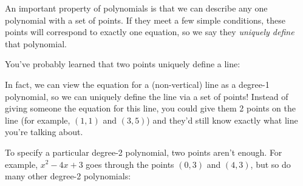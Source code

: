 An important property of polynomials is that we can describe any one 
polynomial with a set of points. If they meet a few simple conditions, 
these points will correspond to exactly one equation, so we say they 
\emph{uniquely define} that polynomial.

You've probably learned that two points uniquely define a line:

\begin{center}
\end{center}

In fact, we can view the equation for a (non-vertical) line as a degree-1 polynomial, so we can uniquely 
define the line via a set of points!
Instead of giving someone the equation for this line, you could 
give them 2 points on the line (for example, $(1,1)$ and $(3,5)$) and they'd 
still know exactly what line you're talking about. 

To specify a particular degree-2 polynomial, two points aren't enough.
For example, $x^2-4x+3$ goes through the points $(0,3)$ and $(4,3)$,
but so do many other degree-2 polynomials: 

\begin{center}
\end{center}

